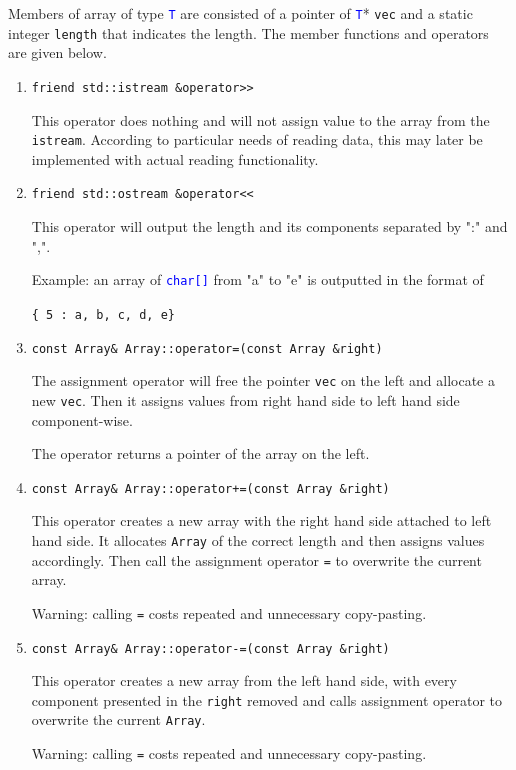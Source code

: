 \documentclass[11pt,a4paper]{article}
\newcommand{\ttype}[1]{\textcolor{blue}{\texttt{#1}}}
\theoremstyle{definition}
\theoremstyle{definition}
\numberwithin{equation}{section}
\begin{document}
	Members of array of type \ttype{T} are consisted of a pointer of \ttype{T}* \texttt{vec} and a static integer \texttt{length} that indicates the length. The member functions and operators are given below.
	
	\begin{enumerate}
		\item \texttt{friend std::istream \&operator>>}
		
		This operator does nothing and will not assign value to the array from the \texttt{istream}. According to particular needs of reading data, this may later be implemented with actual reading functionality.
		
		\item \texttt{friend std::ostream \&operator<<}
		
		This operator will output the length and its components separated by ":" and ",".
		
		Example: an array of \ttype{char[]} from "a" to "e" is outputted in the format of
		
		\texttt{\{ 5 : a, b, c, d, e\}}
		
		\item \texttt{const Array\& Array::operator=(const Array \&right)}
		
		The assignment operator will free the pointer \texttt{vec} on the left and allocate a new \texttt{vec}. Then it assigns values from right hand side to left hand side component-wise. 
		
		The operator returns a pointer of the array on the left.
		
				
		\item \texttt{const Array\& Array::operator+=(const Array \&right)}
		
		This operator creates a new array with the right hand side attached to left hand side. It allocates \texttt{Array} of the correct length and then assigns values accordingly. Then call the assignment operator \texttt{=} to overwrite the current array.
		
		Warning: calling \texttt{=} costs repeated and unnecessary copy-pasting.
		
		\item \texttt{const Array\& Array::operator-=(const Array \&right)}
		
		This operator creates a new array from the left hand side, with every component presented in the \texttt{right} removed and calls assignment operator to overwrite the current \texttt{Array}.
		
		Warning: calling \texttt{=} costs repeated and unnecessary copy-pasting. 
		

\end{enumerate}
\end{document}
